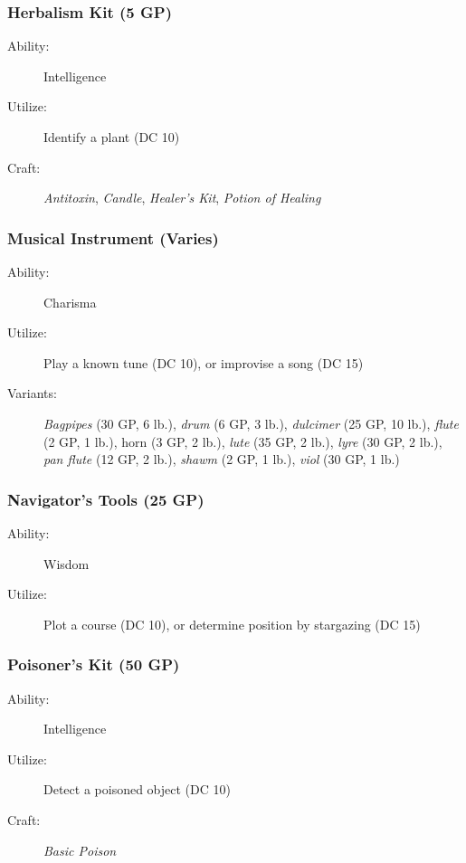 \documentclass[10pt,a4paper,twoside,bg=print,twocolumn,openany,nodeprecatedcode]{dndbook}
\begin{document}
\subsubsection{Herbalism Kit (5 GP)}

\begin{description}
\item[Ability:]
Intelligence
\item[Utilize:]
Identify a plant (DC 10)
\item[Craft:]
\textit{Antitoxin}, \textit{Candle}, \textit{Healer's Kit}, \textit{Potion of Healing}
\end{description}

\subsubsection{Musical Instrument (Varies)}

\begin{description}
\item[Ability:]
Charisma
\item[Utilize:]
Play a known tune (DC 10), or improvise a song (DC 15)
\item[Variants:]
\textit{Bagpipes} (30 GP, 6 lb.), \textit{drum} (6 GP, 3 lb.), \textit{dulcimer} (25 GP, 10 lb.), \textit{flute} (2 GP, 1 lb.), horn (3 GP, 2 lb.), \textit{lute} (35 GP, 2 lb.), \textit{lyre} (30 GP, 2 lb.), \textit{pan flute} (12 GP, 2 lb.), \textit{shawm} (2 GP, 1 lb.), \textit{viol} (30 GP, 1 lb.)
\end{description}

\subsubsection{Navigator's Tools (25 GP)}

\begin{description}
\item[Ability:]
Wisdom
\item[Utilize:]
Plot a course (DC 10), or determine position by stargazing (DC 15)

\end{description}

\subsubsection{Poisoner's Kit (50 GP)}

\begin{description}
\item[Ability:]
Intelligence
\item[Utilize:]
Detect a poisoned object (DC 10)

\item[Craft:]
\textit{Basic Poison}

\end{description}
\end{document}
